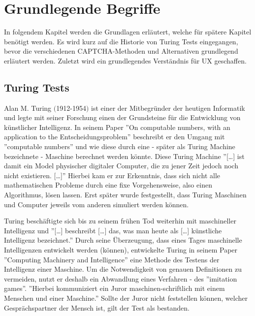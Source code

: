 \chapter{Grundlegende Begriffe}
\label{ch:basics}
In folgendem Kapitel werden die Grundlagen erläutert, welche für spätere Kapitel benötigt werden. 
Es wird kurz auf die Historie von Turing Tests eingegangen, 
bevor die verschiedenen CAPTCHA-Methoden und Alternativen grundlegend erläutert werden. 
Zuletzt wird ein grundlegendes Verständnis für UX geschaffen.

\section{Turing Tests}
\label{ch:basics:turing}
Alan M. Turing $($1912-1954$)$ ist einer der Mitbegründer der heutigen Informatik 
und legte mit seiner Forschung einen der Grundsteine für die Entwicklung von künstlicher Intelligenz. 
In seinem Paper ''On computable numbers, with an application to the Entscheidungsproblem'' \cite{turing} 
beschreibt er den Umgang mit ''computable numbers'' und wie diese durch eine - später als Turing Machine bezeichnete - Maschine berechnet werden könnte.
Diese Turing Machine ''[\dots] ist damit ein Model physischer digitaler Computer, die zu jener Zeit jedoch noch nicht existieren. [\dots]'' \cite[p.4]{pallay2020turing}
Hierbei kam er zur Erkenntnis, dass sich nicht alle mathematischen Probleme durch eine fixe Vorgehensweise, also einen Algorithmus, lösen lassen. 
Erst später wurde festgestellt, dass Turing Maschinen und Computer jeweils vom anderen simuliert werden können. \cite[p.647]{geniusofturing} \cite[p.4]{pallay2020turing} %

Turing beschäftigte sich bis zu seinem frühen Tod weiterhin mit maschineller Intelligenz 
und ''[\dots] beschreibt [\dots] das, was man heute als [\dots] künstliche Intelligenz bezeichnet.'' \cite[p.10]{pallay2020turing}
Durch seine Überzeugung, dass eines Tages maschinelle Intelligenzen entwickelt werden (können), 
entwickelte Turing in seinem Paper ''Computing Machinery and Intelligence'' \cite[p.23ff]{turing2009computing} 
eine Methode des Testens der Intelligenz einer Maschine. 
Um die Notwendigkeit von genauen Definitionen zu vermeiden, nutzt er deshalb ein Abwandlung eines Verfahren - des ''imitation games''. 
''Hierbei kommuniziert ein Juror maschinen-schriftlich mit einem Menschen und einer Maschine.'' \cite[p.12]{pallay2020turing}
Sollte der Juror nicht feststellen können, welcher Gesprächspartner der Mensch ist, gilt der Test als bestanden. \cite[p.11ff]{pallay2020turing}

